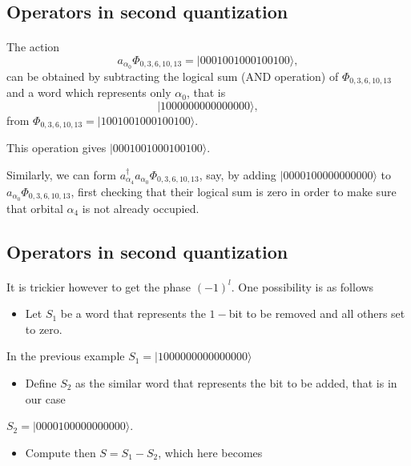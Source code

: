 \documentclass[%
twoside,                 %
final,                   %
10pt]{article}
\begin{document}
\subsection*{Operators in second quantization}

\paragraph{}
The action
\[
a_{\alpha_0}\Phi_{0,3,6,10,13} = |0001001000100100\rangle,
\]
can be obtained by subtracting the logical sum (AND operation) of $\Phi_{0,3,6,10,13}$ and 
a word which represents only $\alpha_0$, that is
\[
|1000000000000000\rangle,
\] 
from $\Phi_{0,3,6,10,13}= |1001001000100100\rangle$.

This operation gives $|0001001000100100\rangle$. 

Similarly, we can form $a^{\dagger}_{\alpha_4}a_{\alpha_0}\Phi_{0,3,6,10,13}$, say, by adding 
$|0000100000000000\rangle$ to $a_{\alpha_0}\Phi_{0,3,6,10,13}$, first checking that their logical sum
is zero in order to make sure that orbital $\alpha_4$ is not already occupied.






\subsection*{Operators in second quantization}

\paragraph{}
It is trickier however to get the phase $(-1)^l$. 
One possibility is as follows
\begin{itemize}
\item Let $S_1$ be a word that represents the $1-$bit to be removed and all others set to zero.
\end{itemize}

\noindent
In the previous example $S_1=|1000000000000000\rangle$
\begin{itemize}
\item Define $S_2$ as the similar word that represents the bit to be added, that is in our case
\end{itemize}

\noindent
$S_2=|0000100000000000\rangle$.
\begin{itemize}
\item Compute then $S=S_1-S_2$, which here becomes
\end{itemize}
\end{document}
